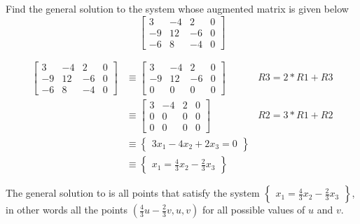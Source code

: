 \documentclass{mathhomework}
\begin{document}
\begin{problem}[1.2\#11]
    Find the general solution to the system whose augmented matrix is given below
    $$\begin{bmatrix}
        3 & -4 & 2 & 0 \\
        -9 & 12 & -6 & 0 \\
        -6 & 8 & -4 & 0
    \end{bmatrix}$$

    \begin{solution}
        \begin{align*}
            \begin{bmatrix}
                3 & -4 & 2 & 0 \\
                -9 & 12 & -6 & 0 \\
                -6 & 8 & -4 & 0
            \end{bmatrix}
            & \equiv
            \begin{bmatrix}
                3 & -4 & 2 & 0 \\
                -9 & 12 & -6 & 0 \\
                0 & 0 & 0 & 0
            \end{bmatrix}
            & R3 = 2 * R1 + R3 \\ & \equiv
            \begin{bmatrix}
                3 & -4 & 2 & 0 \\
                0 & 0 & 0 & 0 \\
                0 & 0 & 0 & 0
            \end{bmatrix}
            & R2 = 3 * R1 + R2 \\ & \equiv
            \begin{Bmatrix}
                3x_1 -4x_2 + 2x_3 = 0
            \end{Bmatrix}
            \\ & \equiv
            \begin{Bmatrix}
                x_1 = \frac{4}{3}x_2 - \frac{2}{3}x_3
            \end{Bmatrix}
        \end{align*}

        The general solution to is all points that satisfy the system $\begin{Bmatrix}
            x_1 = \frac{4}{3}x_2 - \frac{2}{3}x_3
        \end{Bmatrix}$, in other words all the points $(\frac{4}{3}u - \frac{2}{3}v, u, v)$ for all possible values of $u$ and $v$.
    \end{solution}
\end{problem}
\end{document}
